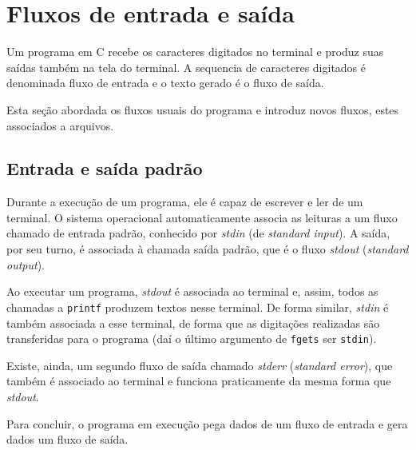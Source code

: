 \documentclass[
  11pt,
  a4paper,
]{scrbook}
\begin{document}
\section{Fluxos de entrada e saída}\label{fluxos-de-entrada-e-sauxedda}

Um programa em C recebe os caracteres digitados no terminal e produz
suas saídas também na tela do terminal. A sequencia de caracteres
digitados é denominada fluxo de entrada e o texto gerado é o fluxo de
saída.

Esta seção abordada os fluxos usuais do programa e introduz novos
fluxos, estes associados a arquivos.

\subsection{Entrada e saída padrão}\label{entrada-e-sauxedda-padruxe3o}

Durante a execução de um programa, ele é capaz de escrever e ler de um
terminal. O sistema operacional automaticamente associa as leituras a um
fluxo chamado de entrada padrão, conhecido por \emph{stdin} (de
\emph{standard input}). A saída, por seu turno, é associada à chamada
saída padrão, que é o fluxo \emph{stdout} (\emph{standard output}).

Ao executar um programa, \emph{stdout} é associada ao terminal e, assim,
todos as chamadas a \texttt{printf} produzem textos nesse terminal. De
forma similar, \emph{stdin} é também associada a esse terminal, de forma
que as digitações realizadas são transferidas para o programa (daí o
último argumento de \texttt{fgets} ser \texttt{stdin}).

\begin{tcolorbox}[enhanced jigsaw, arc=.35mm, bottomtitle=1mm, colbacktitle=quarto-callout-warning-color!10!white, title=\textcolor{quarto-callout-warning-color}{\faExclamationTriangle}\hspace{0.5em}{Curiosidade}, toprule=.15mm, left=2mm, opacityback=0, colback=white, colframe=quarto-callout-warning-color-frame, opacitybacktitle=0.6, bottomrule=.15mm, leftrule=.75mm, toptitle=1mm, coltitle=black, titlerule=0mm, rightrule=.15mm, breakable]

Existe, ainda, um segundo fluxo de saída chamado \emph{stderr}
(\emph{standard error}), que também é associado ao terminal e funciona
praticamente da mesma forma que \emph{stdout}.

\end{tcolorbox}

Para concluir, o programa em execução pega dados de um fluxo de entrada
e gera dados um fluxo de saída.
\end{document}

